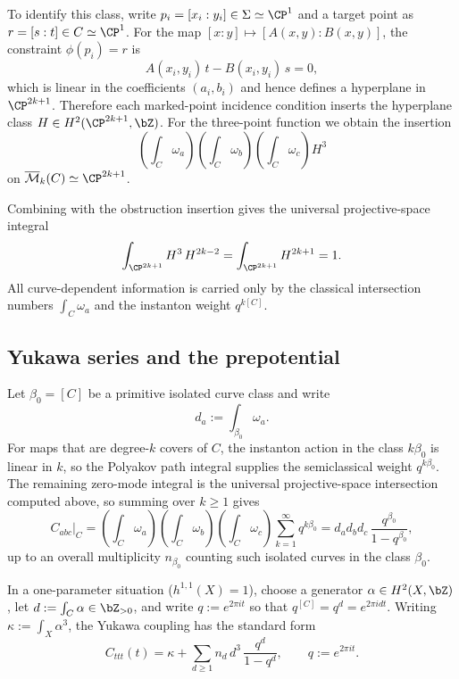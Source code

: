 \documentclass[12pt]{article}
\begin{document}
To identify this class, write $p_i=[x_i:y_i]\in\Sigma\simeq\CP^1$ and a target
point as $r=[s:t]\in C\simeq\CP^1$. For the map $[x:y]\mapsto[A(x,y):B(x,y)]$,
the constraint $\phi(p_i)=r$ is
\begin{equation}
  A(x_i,y_i)\,t - B(x_i,y_i)\,s = 0,
\end{equation}
which is linear in the coefficients $(a_i,b_i)$ and hence defines a hyperplane
in $\CP^{2k+1}$. Therefore each marked-point incidence condition inserts the
hyperplane class $H\in H^2(\CP^{2k+1},\bZ)$. For the three-point function we
obtain the insertion
\begin{equation}
  \left(\int_C\omega_a\right)\left(\int_C\omega_b\right)\left(\int_C\omega_c\right)H^3
\end{equation}
on $\overline{\mathcal{M}}_k(C)\simeq\CP^{2k+1}$.

Combining with the obstruction insertion gives the universal projective-space
integral
\begin{equation}
  \int_{\CP^{2k+1}} H^3\,H^{2k-2}
  =\int_{\CP^{2k+1}} H^{2k+1}
  =1.
\end{equation}
All curve-dependent information is carried only by the classical intersection
numbers $\int_C \omega_a$ and the instanton weight $q^{k[C]}$.

\subsection{Yukawa series and the prepotential}
Let $\beta_0=[C]$ be a primitive isolated curve class and write
\begin{equation}
  d_a := \int_{\beta_0}\omega_a.
\end{equation}
For maps that are degree-$k$ covers of $C$, the instanton action in the class
$k\beta_0$ is linear in $k$, so the Polyakov path integral supplies the
semiclassical weight $q^{k\beta_0}$. The remaining zero-mode integral is the
universal projective-space intersection computed above, so summing over $k\ge1$
gives
\begin{equation}
  C_{abc}\Big|_{C}
  = \left(\int_C \omega_a\right)\left(\int_C \omega_b\right)\left(\int_C
  \omega_c\right)\sum_{k=1}^{\infty} q^{k\beta_0}
  = d_a d_b d_c\,\frac{q^{\beta_0}}{1-q^{\beta_0}},
\end{equation}
up to an overall multiplicity $n_{\beta_0}$ counting such isolated curves in the
class $\beta_0$.

In a one-parameter situation ($h^{1,1}(X)=1$), choose a generator $\alpha\in
H^2(X,\bZ)$, let $d:=\int_C\alpha\in\bZ_{>0}$, and write $q:=e^{2\pi i t}$ so
that $q^{[C]}=q^d=e^{2\pi i d t}$. Writing $\kappa:=\int_X\alpha^3$, the Yukawa
coupling has
the standard form
\begin{equation}
  C_{ttt}(t)
  = \kappa + \sum_{d\ge1} n_d\, d^3\,\frac{q^d}{1-q^d},
  \qquad
  q:=e^{2\pi i t}.
\end{equation}
\end{document}
